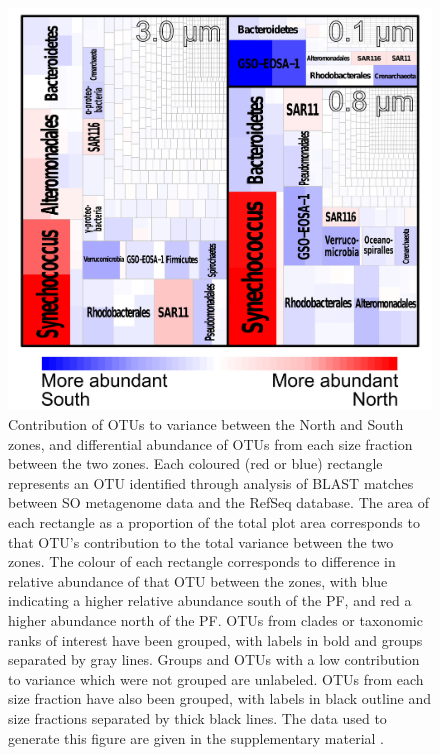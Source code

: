 \begin{figure}[!ht]
  \centering
  \includegraphics[width=\textwidth]{../polarfront/taxotreemap.png}
  \caption[Contribution of \acp{OTU} to variance between the North and South zones]{Contribution of \acp{OTU} to variance between the North and South zones, and differential abundance of \acp{OTU} from each size fraction between the two zones.
Each coloured (red or blue) rectangle represents an OTU identified through analysis of BLAST matches between SO metagenome data and the RefSeq database.
The area of each rectangle as a proportion of the total plot area corresponds to that \ac{OTU}'s contribution to the total variance between the two zones.
The colour of each rectangle corresponds to difference in relative abundance of that OTU between the zones, with blue indicating a higher relative abundance south of the PF, and red a higher abundance north of the PF.
\acp{OTU} from clades or taxonomic ranks of interest have been grouped, with labels in bold and groups separated by gray lines. 
Groups and \acp{OTU} with a low contribution to variance which were not grouped are unlabeled.
\acp{OTU} from each size fraction have also been grouped, with labels in black outline and size fractions separated by thick black lines. 
The data used to generate this figure are given in the supplementary material .
  }
  \label{fig:taxotreemap}
\end{figure}
